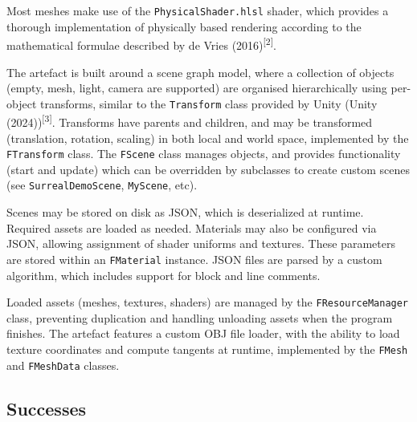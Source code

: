 \documentclass[
]{article}
\begin{document}
{Most meshes make use of the \texttt{PhysicalShader.hlsl} shader, which
provides a thorough implementation of physically based rendering
according to the mathematical formulae described by de Vries
(2016)\textsuperscript{{[}2{]}}.

The artefact is built around a scene graph model, where a collection of
objects (empty, mesh, light, camera are supported) are organised
hierarchically using per-object transforms, similar to the
\texttt{Transform} class provided by Unity (Unity
(2024))\textsuperscript{{[}3{]}}. Transforms have parents and children,
and may be transformed (translation, rotation, scaling) in both local
and world space, implemented by the \texttt{FTransform} class. The
\texttt{FScene} class manages objects, and provides functionality (start
and update) which can be overridden by subclasses to create custom
scenes (see \texttt{SurrealDemoScene}, \texttt{MyScene}, etc).

Scenes may be stored on disk as JSON, which is deserialized at runtime.
Required assets are loaded as needed. Materials may also be configured
via JSON, allowing assignment of shader uniforms and textures. These
parameters are stored within an \texttt{FMaterial} instance. JSON files
are parsed by a custom algorithm, which includes support for block and
line comments.

Loaded assets (meshes, textures, shaders) are managed by the
\texttt{FResourceManager} class, preventing duplication and handling
unloading assets when the program finishes. The artefact features a
custom OBJ file loader, with the ability to load texture coordinates and
compute tangents at runtime, implemented by the \texttt{FMesh} and
\texttt{FMeshData} classes.

\hypertarget{successes}{%
\subsection{Successes}\label{successes}}

}
\end{document}
